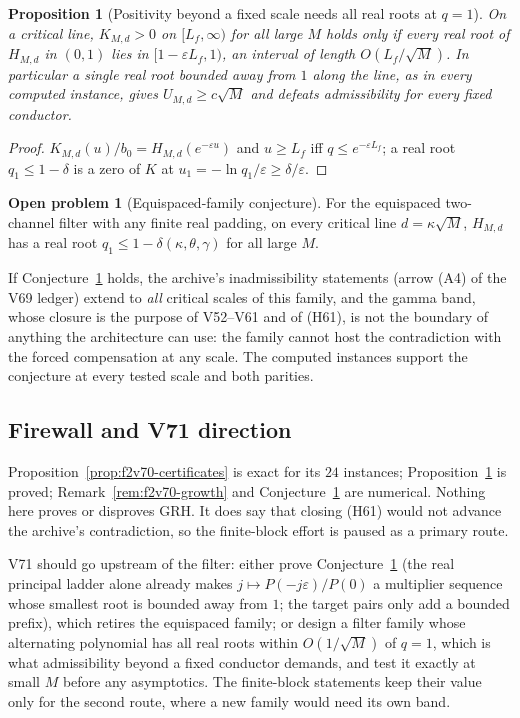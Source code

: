 \documentclass[11pt]{article}
\newtheorem{proposition}[theorem]{Proposition}
\theoremstyle{definition}
\newtheorem{problem}[theorem]{Open problem}
\theoremstyle{remark}
\begin{document}
\begin{proposition}[Positivity beyond a fixed scale needs all real roots at \(q=1\)]
\label{prop:f2v70-needs}
On a critical line, \(K_{M,d}>0\) on \([L_f,\infty)\) for all large \(M\)
holds only if every real root of \(H_{M,d}\) in \((0,1)\) lies in
\([1-\varepsilon L_f,1)\), an interval of length \(O(L_f/\sqrt M)\).  In
particular a single real root bounded away from \(1\) along the line, as
in every computed instance, gives \(U_{M,d}\ge c\sqrt M\) and defeats
admissibility for every fixed conductor.
\end{proposition}

\begin{proof}
\(K_{M,d}(u)/b_0=H_{M,d}(e^{-\varepsilon u})\) and \(u\ge L_f\) iff
\(q\le e^{-\varepsilon L_f}\); a real root \(q_1\le1-\delta\) is a zero of
\(K\) at \(u_1=-\ln q_1/\varepsilon\ge\delta/\varepsilon\).
\end{proof}

\begin{problem}[Equispaced-family conjecture]
\label{conj:f2v70-family}
For the equispaced two-channel filter with any finite real padding, on
every critical line \(d=\kappa\sqrt M\), \(H_{M,d}\) has a real root
\(q_1\le1-\delta(\kappa,\theta,\gamma)\) for all large \(M\).
\end{problem}

If Conjecture~\ref{conj:f2v70-family} holds, the archive's inadmissibility
statements (arrow \textup{(A4)} of the V69 ledger) extend to \emph{all}
critical scales of this family, and the gamma band, whose closure is the
purpose of V52--V61 and of (H61), is not the boundary of anything the
architecture can use: the family cannot host the contradiction with the
forced compensation at any scale.  The computed instances support the
conjecture at every tested scale and both parities.

\subsection*{Firewall and V71 direction}
\label{fire:f2v70}
Proposition~\ref{prop:f2v70-certificates} is exact for its \(24\)
instances; Proposition~\ref{prop:f2v70-needs} is proved;
Remark~\ref{rem:f2v70-growth} and Conjecture~\ref{conj:f2v70-family} are
numerical.  Nothing here proves or disproves GRH.  It does say that
closing (H61) would not advance the archive's contradiction, so the
finite-block effort is paused as a primary route.

V71 should go upstream of the filter: either prove
Conjecture~\ref{conj:f2v70-family} (the real principal ladder alone
already makes \(j\mapsto P(-j\varepsilon)/P(0)\) a multiplier sequence
whose smallest root is bounded away from \(1\); the target pairs only
add a bounded prefix), which retires the equispaced family; or design a
filter family whose alternating polynomial has all real roots within
\(O(1/\sqrt M)\) of \(q=1\), which is what admissibility beyond a fixed
conductor demands, and test it exactly at small \(M\) before any
asymptotics.  The finite-block statements keep their value only for the
second route, where a new family would need its own band.
\end{document}
